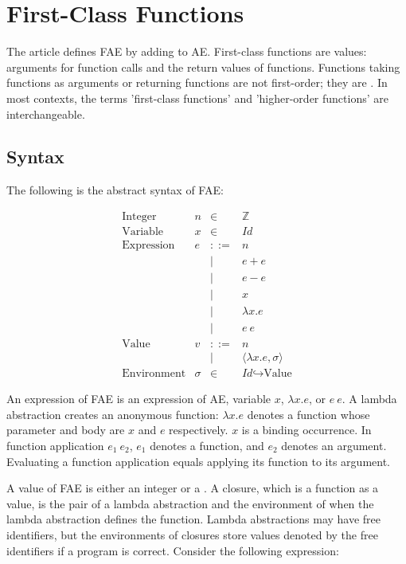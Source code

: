 \setchapterpreamble[u]{\margintoc}
\chapter{First-Class Functions}

The article defines FAE by adding  to AE. First-class
functions are values: arguments for function calls and the return values of
functions. Functions taking functions as arguments or returning functions are not
first-order; they are . In most contexts, the terms
'first-class functions' and 'higher-order functions' are interchangeable.

\section{Syntax}

The following is the abstract syntax of FAE:

\[
\begin{array}{lrcl}
\text{Integer} & n & \in & \mathbb{Z} \\
\text{Variable} & x & \in & \textit{Id} \\
\text{Expression} & e & ::= & n \\
&& | & e + e \\
&& | & e - e \\
&& | & x \\
&& | & \lambda x.e \\
&& | & e\ e \\
\text{Value} & v & ::= & n \\
&& | & \langle \lambda x.e,\sigma \rangle \\
\text{Environment} & \sigma & \in & \textit{Id}\hookrightarrow\text{Value}
\end{array}
\]

An expression of FAE is an expression of AE, variable \(x\),  \(\lambda x.e\), or  \(e\ e\). A lambda
abstraction creates an anonymous function: \(\lambda x.e\) denotes a function
whose parameter and body are \(x\) and \(e\) respectively. \(x\) is a binding
occurrence. In function application \(e_1\ e_2\), \(e_1\) denotes a function, and
\(e_2\) denotes an argument. Evaluating a function application equals applying
its function to its argument.

A value of FAE is either an integer or a . A closure, which is a
function as a value, is the pair of a lambda abstraction and the environment of
when the lambda abstraction defines the function. Lambda abstractions may have
free identifiers, but the environments of closures store values denoted by the
free identifiers if a program is correct. Consider the following expression:

